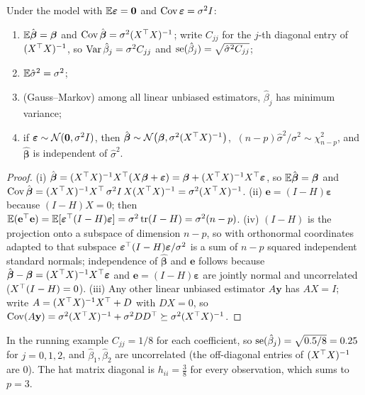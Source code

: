 \begin{theorem}\label{thm:mlr-dist}
Under the model with $\mathbb{E}\boldsymbol\varepsilon=\mathbf{0}$ and $\operatorname{Cov}\boldsymbol\varepsilon=\sigma^2I$:
\begin{enumerate}[label=(\roman*)]
  \item $\mathbb{E}\hat{\boldsymbol\beta}=\boldsymbol\beta$ and $\operatorname{Cov}\hat{\boldsymbol\beta}=\sigma^2(X^{\top} X)^{-1}$; write $C_{jj}$ for the $j$-th diagonal entry of $(X^{\top} X)^{-1}$, so $\operatorname{Var}\hat\beta_j=\sigma^2C_{jj}$ and $\operatorname{se}(\hat\beta_j)=\sqrt{\hat\sigma^2C_{jj}}$;
  \item $\mathbb{E}\hat\sigma^2=\sigma^2$;
  \item (Gauss--Markov) among all linear unbiased estimators, $\hat\beta_j$ has minimum variance;
  \item if $\boldsymbol\varepsilon\sim\mathcal{N}(\mathbf{0},\sigma^2I)$, then $\hat{\boldsymbol\beta}\sim\mathcal{N}\big(\boldsymbol\beta,\sigma^2(X^{\top} X)^{-1}\big)$, $\ (n-p)\hat\sigma^2/\sigma^2\sim\chi^2_{n-p}$, and $\hat{\boldsymbol\beta}$ is independent of $\hat\sigma^2$.
\end{enumerate}
\end{theorem}

\begin{proof}
(i) $\hat{\boldsymbol\beta}=(X^{\top} X)^{-1}X^{\top}(X\boldsymbol\beta+\boldsymbol\varepsilon)=\boldsymbol\beta+(X^{\top} X)^{-1}X^{\top}\boldsymbol\varepsilon$, so $\mathbb{E}\hat{\boldsymbol\beta}=\boldsymbol\beta$ and $\operatorname{Cov}\hat{\boldsymbol\beta}=(X^{\top} X)^{-1}X^{\top}\,\sigma^2I\,X(X^{\top} X)^{-1}=\sigma^2(X^{\top} X)^{-1}$. (ii) $\mathbf{e}=(I-H)\boldsymbol\varepsilon$ because $(I-H)X=0$; then $\mathbb{E}(\mathbf{e}^{\top}\mathbf{e})=\mathbb{E}[\boldsymbol\varepsilon^{\top}(I-H)\boldsymbol\varepsilon]=\sigma^2\operatorname{tr}(I-H)=\sigma^2(n-p)$. (iv) $(I-H)$ is the projection onto a subspace of dimension $n-p$, so with orthonormal coordinates adapted to that subspace $\boldsymbol\varepsilon^{\top}(I-H)\boldsymbol\varepsilon/\sigma^2$ is a sum of $n-p$ squared independent standard normals; independence of $\hat{\boldsymbol\beta}$ and $\mathbf{e}$ follows because $\hat{\boldsymbol\beta}-\boldsymbol\beta=(X^{\top} X)^{-1}X^{\top}\boldsymbol\varepsilon$ and $\mathbf{e}=(I-H)\boldsymbol\varepsilon$ are jointly normal and uncorrelated ($X^{\top}(I-H)=0$). (iii) Any other linear unbiased estimator $A\mathbf{y}$ has $AX=I$; write $A=(X^{\top} X)^{-1}X^{\top}+D$ with $DX=0$, so $\operatorname{Cov}(A\mathbf{y})=\sigma^2(X^{\top} X)^{-1}+\sigma^2DD^{\top}\succeq\sigma^2(X^{\top} X)^{-1}$.
\end{proof}

\begin{example}
In the running example $C_{jj}=1/8$ for each coefficient, so $\operatorname{se}(\hat\beta_j)=\sqrt{0.5/8}=0.25$ for $j=0,1,2$, and $\hat\beta_1,\hat\beta_2$ are uncorrelated (the off-diagonal entries of $(X^{\top} X)^{-1}$ are $0$). The hat matrix diagonal is $h_{ii}=\tfrac38$ for every observation, which sums to $p=3$.
\end{example}

